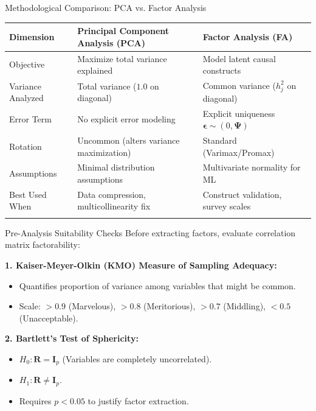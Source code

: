 \documentclass[aspectratio=169,ignorenonframetext]{beamer}
\begin{document}
\begin{frame}{Methodological Comparison: PCA vs. Factor Analysis}
{\def\LTcaptype{none} %
\begin{longtable}[]{@{}
  >{\raggedright\arraybackslash}p{}
  >{\raggedright\arraybackslash}p{}
  >{\raggedright\arraybackslash}p{}@{}}
\toprule\noalign{}
\begin{minipage}[b]{\linewidth}\raggedright
\textbf{Dimension}
\end{minipage} & \begin{minipage}[b]{\linewidth}\raggedright
\textbf{Principal Component Analysis (PCA)}
\end{minipage} & \begin{minipage}[b]{\linewidth}\raggedright
\textbf{Factor Analysis (FA)}
\end{minipage} \\
\midrule\noalign{}
\endhead
Objective & Maximize total variance explained & Model latent causal
constructs \\
Variance Analyzed & Total variance (\(1.0\) on diagonal) & Common
variance (\(h_{j}^{2}\) on diagonal) \\
Error Term & No explicit error modeling & Explicit uniqueness
\(\mathbf{\epsilon} \sim \left( 0,\mathbf{\Psi} \right)\) \\
Rotation & Uncommon (alters variance maximization) & Standard
(Varimax/Promax) \\
Assumptions & Minimal distribution assumptions & Multivariate normality
for ML \\
Best Used When & Data compression, multicollinearity fix & Construct
validation, survey scales \\
\bottomrule\noalign{}
\end{longtable}
}
\end{frame}

\begin{frame}{Pre-Analysis Suitability Checks}
Before extracting factors, evaluate correlation matrix factorability:

\textbf{1. Kaiser-Meyer-Olkin (KMO) Measure of Sampling Adequacy:}

\begin{itemize}
\item
  Quantifies proportion of variance among variables that might be
  common.
\item
  Scale: \(> 0.9\) (Marvelous), \(> 0.8\) (Meritorious), \(> 0.7\)
  (Middling), \(< 0.5\) (Unacceptable).
\end{itemize}

\textbf{2. Bartlett's Test of Sphericity:}

\begin{itemize}
\item
  \(H_{0}:\mathbf{R} = \mathbf{I}_{p}\) (Variables are completely
  uncorrelated).
\item
  \(H_{1}:\mathbf{R} \neq \mathbf{I}_{p}\).
\item
  Requires \(p < 0.05\) to justify factor extraction.
\end{itemize}
\end{frame}
\end{document}
